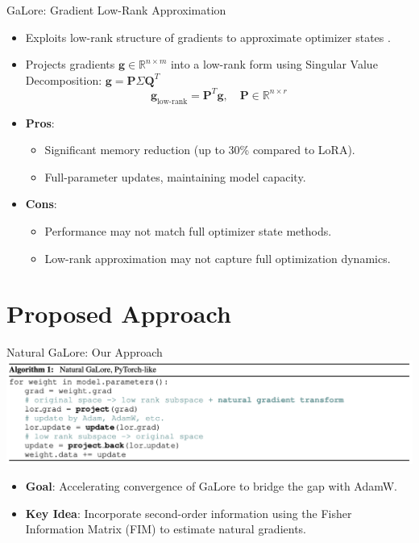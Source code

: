 \documentclass{beamer}
\begin{document}
\begin{frame}{GaLore: Gradient Low-Rank Approximation}
    \begin{itemize}
        \item Exploits low-rank structure of gradients to approximate optimizer states \citep{zhao2024galore}.
        \item Projects gradients \(\mathbf{g} \in \mathbb{R}^{n \times m}\) into a low-rank form using Singular Value Decomposition: \(\mathbf{g} = \mathbf{P} \Sigma \mathbf{Q}^{T}\)
        \begin{equation}
            \mathbf{g}_{\text{low-rank}} = \mathbf{P}^{T} \mathbf{g}, \quad \mathbf{P} \in \mathbb{R}^{n \times r}
        \end{equation}
        \item \textbf{Pros}:
            \begin{itemize}
                \item Significant memory reduction (up to 30\% compared to LoRA).
                \item Full-parameter updates, maintaining model capacity.
            \end{itemize}
        \item \textbf{Cons}:
            \begin{itemize}
                \item Performance may not match full optimizer state methods.
                \item Low-rank approximation may not capture full optimization dynamics.
            \end{itemize}
    \end{itemize}
\end{frame}

\section{Proposed Approach}

\begin{frame}{Natural GaLore: Our Approach}
    \includegraphics[width=\textwidth]{figures/natural_galore_algorithm.png}
    \begin{itemize}
        \item \textbf{Goal}: Accelerating convergence of GaLore to bridge the gap with AdamW.
        \item \textbf{Key Idea}: Incorporate second-order information using the Fisher Information Matrix (FIM) to estimate natural gradients.
    \end{itemize}
\end{frame}
\end{document}
